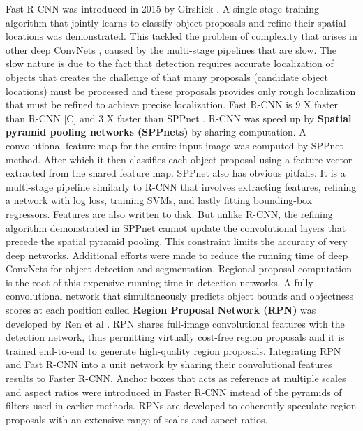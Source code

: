 Fast R-CNN was introduced in 2015 by Girshick \protect\cite{F}. A single-stage training algorithm that jointly learns to classify object proposals and refine their spatial locations was demonstrated. This tackled the problem of complexity that arises in other deep ConvNets \protect\cite{D}\protect\cite{G}\protect\cite{H}, caused by the multi-stage pipelines that are slow. The slow nature is due to the fact that detection requires accurate localization of objects that creates the challenge of that many proposals (candidate object locations) must be processed and these proposals provides only rough localization that must be refined to achieve precise localization. Fast R-CNN is 9 X faster than R-CNN [C] and 3 X faster than SPPnet \protect\cite{I}. R-CNN was speed up by \textbf{Spatial pyramid pooling networks (SPPnets)}\protect\cite{I} by sharing computation. A convolutional feature map for the entire input image was computed by SPPnet method. After which it then classifies each object proposal using a feature vector extracted from the shared feature map. SPPnet also has obvious pitfalls. It is a multi-stage pipeline similarly to R-CNN that involves extracting features, refining a network with log loss, training SVMs, and lastly fitting bounding-box regressors. Features are also written to disk. But unlike R-CNN, the refining algorithm demonstrated in SPPnet cannot update the convolutional layers that precede the spatial pyramid pooling. This constraint limits the accuracy of very deep networks.
Additional efforts were made to reduce the running time of deep ConvNets for object detection and segmentation. Regional proposal computation is the root of this expensive running time in detection networks. A fully convolutional network that simultaneously predicts object bounds and objectness scores at each position called \textbf{ Region Proposal Network (RPN) }was developed by Ren et al \protect\cite{J}. RPN shares full-image convolutional features with the detection network, thus permitting virtually cost-free region proposals and it is trained end-to-end to generate high-quality region proposals. Integrating RPN and Fast R-CNN into a unit network by sharing their convolutional features results to Faster R-CNN. Anchor boxes that acts as reference at multiple scales and aspect ratios were introduced in Faster R-CNN instead of the pyramids of filters used in earlier methods. RPNs are developed to coherently speculate region proposals with an extensive range of scales and aspect ratios.
